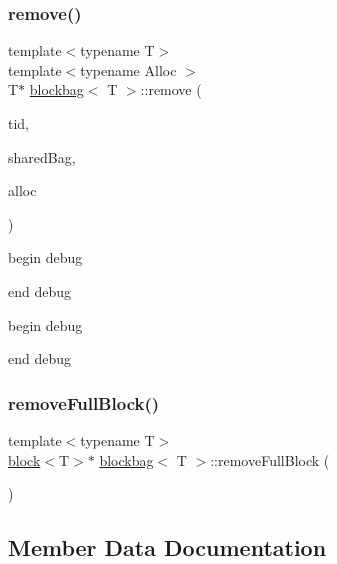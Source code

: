 \mbox{\label{classblockbag_a3d7ed27113ec3ff8239ff7739664dd0b}} 
\subsubsection{\texorpdfstring{remove()}{remove()}\hspace{0.1cm}{\footnotesize\ttfamily [2/2]}}
{\footnotesize\ttfamily template$<$typename T$>$ \\
template$<$typename Alloc $>$ \\
T$\ast$ \hyperlink{classblockbag}{blockbag}$<$ T $>$\+::remove (\begin{DoxyParamCaption}\item[{const int}]{tid,  }\item[{\hyperlink{classlockfreeblockbag}{lockfreeblockbag}$<$ T $>$ $\ast$const}]{shared\+Bag,  }\item[{Alloc $\ast$const}]{alloc }\end{DoxyParamCaption})\hspace{0.3cm}{\ttfamily [inline]}}

begin debug

end debug

begin debug

end debug \mbox{\label{classblockbag_adba6ec96857fc02a2eceba07568fafae}} 
\subsubsection{\texorpdfstring{remove\+Full\+Block()}{removeFullBlock()}}
{\footnotesize\ttfamily template$<$typename T$>$ \\
\hyperlink{classblock}{block}$<$T$>$$\ast$ \hyperlink{classblockbag}{blockbag}$<$ T $>$\+::remove\+Full\+Block (\begin{DoxyParamCaption}{ }\end{DoxyParamCaption})\hspace{0.3cm}{\ttfamily [inline]}}



\subsection{Member Data Documentation}
\mbox{\label{classblockbag_a6245fc873d3db253783944ce2bbbacce}} 
